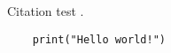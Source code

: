 \documentclass[11pt]{article}
\begin{document}


\tableofcontents
\listoffigures
\listoftables

Citation test \cite{lalonde2017}.

\begin{verbatim}
    print("Hello world!")
\end{verbatim}




\end{document}
